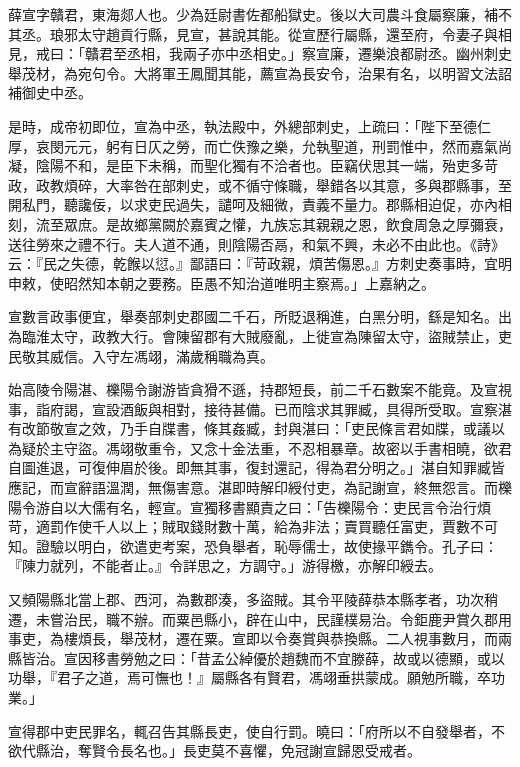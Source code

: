 
\begin{pinyinscope}
薛宣字贛君，東海郯人也。少為廷尉書佐都船獄史。後以大司農斗食屬察廉，補不其丞。琅邪太守趙貢行縣，見宣，甚說其能。從宣歷行屬縣，還至府，令妻子與相見，戒曰：「贛君至丞相，我兩子亦中丞相史。」察宣廉，遷樂浪都尉丞。幽州刺史舉茂材，為宛句令。大將軍王鳳聞其能，薦宣為長安令，治果有名，以明習文法詔補御史中丞。

是時，成帝初即位，宣為中丞，執法殿中，外總部刺史，上疏曰：「陛下至德仁厚，哀閔元元，躬有日仄之勞，而亡佚豫之樂，允執聖道，刑罰惟中，然而嘉氣尚凝，陰陽不和，是臣下未稱，而聖化獨有不洽者也。臣竊伏思其一端，殆吏多苛政，政教煩碎，大率咎在部刺史，或不循守條職，舉錯各以其意，多與郡縣事，至開私門，聽讒佞，以求吏民過失，譴呵及細微，責義不量力。郡縣相迫促，亦內相刻，流至眾庶。是故鄉黨闕於嘉賓之懽，九族忘其親親之恩，飲食周急之厚彌衰，送往勞來之禮不行。夫人道不通，則陰陽否鬲，和氣不興，未必不由此也。《詩》云：『民之失德，乾餱以愆。』鄙語曰：『苛政親，煩苦傷恩。』方刺史奏事時，宜明申敕，使昭然知本朝之要務。臣愚不知治道唯明主察焉。」上嘉納之。

宣數言政事便宜，舉奏部刺史郡國二千石，所貶退稱進，白黑分明，繇是知名。出為臨淮太守，政教大行。會陳留郡有大賊廢亂，上徙宣為陳留太守，盜賊禁止，吏民敬其威信。入守左馮翊，滿歲稱職為真。

始高陵令陽湛、櫟陽令謝游皆貪猾不遜，持郡短長，前二千石數案不能竟。及宣視事，詣府謁，宣設酒飯與相對，接待甚備。已而陰求其罪臧，具得所受取。宣察湛有改節敬宣之效，乃手自牒書，條其姦臧，封與湛曰：「吏民條言君如牒，或議以為疑於主守盜。馮翊敬重令，又念十金法重，不忍相暴章。故密以手書相曉，欲君自圖進退，可復伸眉於後。即無其事，復封還記，得為君分明之。」湛自知罪臧皆應記，而宣辭語溫潤，無傷害意。湛即時解印綬付吏，為記謝宣，終無怨言。而櫟陽令游自以大儒有名，輕宣。宣獨移書顯責之曰：「告櫟陽令：吏民言令治行煩苛，適罰作使千人以上；賊取錢財數十萬，給為非法；賣買聽任富吏，賈數不可知。證驗以明白，欲遣吏考案，恐負舉者，恥辱儒士，故使掾平鐫令。孔子曰：『陳力就列，不能者止。』令詳思之，方調守。」游得檄，亦解印綬去。

又頻陽縣北當上郡、西河，為數郡湊，多盜賊。其令平陵薛恭本縣孝者，功次稍遷，未嘗治民，職不辦。而粟邑縣小，辟在山中，民謹樸易治。令鉅鹿尹賞久郡用事吏，為樓煩長，舉茂材，遷在粟。宣即以令奏賞與恭換縣。二人視事數月，而兩縣皆治。宣因移書勞勉之曰：「昔孟公綽優於趙魏而不宜滕薛，故或以德顯，或以功舉，『君子之道，焉可憮也！』屬縣各有賢君，馮翊垂拱蒙成。願勉所職，卒功業。」

宣得郡中吏民罪名，輒召告其縣長吏，使自行罰。曉曰：「府所以不自發舉者，不欲代縣治，奪賢令長名也。」長吏莫不喜懼，免冠謝宣歸恩受戒者。


\end{pinyinscope}
